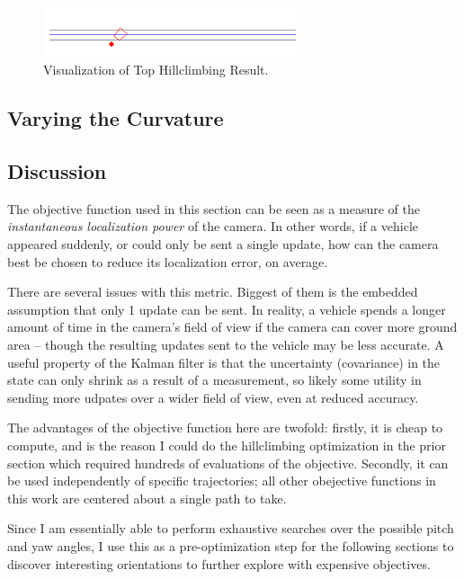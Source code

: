 \documentclass[a4paper,12pt,twoside,openright]{report}
\begin{document}
\begin{figure}[htb]
    \centering
    \includegraphics[width=3in]{figures/simple_objective/top_hillclimb.png}
    \caption[Top Hillclimbing Result]{Visualization of Top Hillclimbing Result.}
    \label{fig:simpleobjective:hillclimb result}
\end{figure}

\subsection{Varying the Curvature}



\subsection{Discussion}

The objective function used in this section can be seen as
a measure of the \textit{instantaneous localization power}
of the camera. In other words, if a vehicle appeared suddenly, or
could only be sent a single update, how can the camera best be chosen
to reduce its localization error, on average.

There are several issues with this metric. Biggest of them
is the embedded assumption that only 1 update can be sent.
In reality, a vehicle spends a longer amount of time in the camera's
field of view if the camera can cover more ground area -- 
though the resulting updates sent to the vehicle may be
less accurate. A useful property of the Kalman
filter is that the uncertainty (covariance) in the state
can only shrink as a result of a measurement, so likely some
utility in sending more udpates over a wider field of view,
even at reduced accuracy. 

The advantages of the objective function here are twofold:
firstly, it is cheap to compute, and is the reason I could
do the hillclimbing optimization in the prior section which
required hundreds of evaluations of the objective. Secondly,
it can be used independently of specific trajectories; all
other obejective functions in this work are centered about
a single path to take.

Since I am essentially able to perform exhaustive searches
over the possible pitch and yaw angles, I use this
as a pre-optimization step for the following sections to discover
interesting orientations to further explore with expensive objectives.
\end{document}
